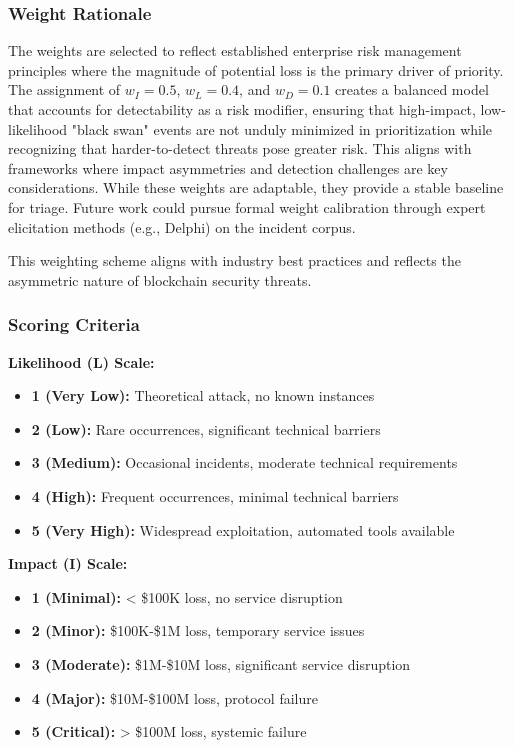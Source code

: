 \subsubsection{Weight Rationale}
The weights are selected to reflect established enterprise risk management principles where the magnitude of potential loss is the primary driver of priority. The assignment of $w_I=0.5$, $w_L=0.4$, and $w_D=0.1$ creates a balanced model that accounts for detectability as a risk modifier, ensuring that high-impact, low-likelihood "black swan" events are not unduly minimized in prioritization while recognizing that harder-to-detect threats pose greater risk. This aligns with frameworks where impact asymmetries and detection challenges are key considerations. While these weights are adaptable, they provide a stable baseline for triage. Future work could pursue formal weight calibration through expert elicitation methods (e.g., Delphi) on the incident corpus.

This weighting scheme aligns with industry best practices and reflects the asymmetric nature of blockchain security threats.

\subsubsection{Scoring Criteria}
\textbf{Likelihood (L) Scale:}
\begin{itemize}
    \item \textbf{1 (Very Low):} Theoretical attack, no known instances
    \item \textbf{2 (Low):} Rare occurrences, significant technical barriers
    \item \textbf{3 (Medium):} Occasional incidents, moderate technical requirements
    \item \textbf{4 (High):} Frequent occurrences, minimal technical barriers
    \item \textbf{5 (Very High):} Widespread exploitation, automated tools available
\end{itemize}

\textbf{Impact (I) Scale:}
\begin{itemize}
    \item \textbf{1 (Minimal):} < \$100K loss, no service disruption
    \item \textbf{2 (Minor):} \$100K-\$1M loss, temporary service issues
    \item \textbf{3 (Moderate):} \$1M-\$10M loss, significant service disruption
    \item \textbf{4 (Major):} \$10M-\$100M loss, protocol failure
    \item \textbf{5 (Critical):} > \$100M loss, systemic failure
\end{itemize}

